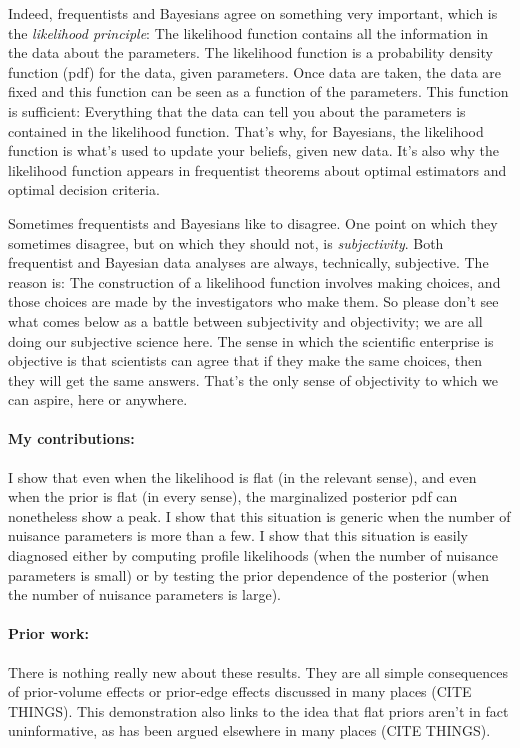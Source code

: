 \documentclass[10pt]{article}
\begin{document}
Indeed, frequentists and Bayesians agree on something very important,
which is the \emph{likelihood principle}:
The likelihood function contains all the information in the data about the parameters.
The likelihood function is a probability density function (pdf) for the data, given parameters.
Once data are taken, the data are fixed and this function can be seen as a function of the parameters.
This function is sufficient:
Everything that the data can tell you about the parameters is contained in the likelihood function.
That's why, for Bayesians, the likelihood function is what's used to update your beliefs, given new data.
It's also why the likelihood function appears in frequentist theorems about optimal estimators and optimal decision criteria.

Sometimes frequentists and Bayesians like to disagree.
One point on which they sometimes disagree, but on which they should not, is \emph{subjectivity}.
Both frequentist and Bayesian data analyses are always, technically, subjective.
The reason is: The construction of a likelihood function involves making choices, and those choices are made by the investigators who make them.
So please don't see what comes below as a battle between subjectivity and objectivity; we are all doing our subjective science here.
The sense in which the scientific enterprise is objective is that scientists can agree that if they make the same choices, then they will get the same answers.
That's the only sense of objectivity to which we can aspire, here or anywhere.

\paragraph{My contributions:}
I show that even when the likelihood is flat (in the relevant sense), and even when the prior is flat (in every sense), the marginalized posterior pdf can nonetheless show a peak.
I show that this situation is generic when the number of nuisance parameters is more than a few.
I show that this situation is easily diagnosed either by computing profile likelihoods (when the number of nuisance parameters is small) or by testing the prior dependence of the posterior (when the number of nuisance parameters is large).

\paragraph{Prior work:}
There is nothing really new about these results.
They are all simple consequences of prior-volume effects or prior-edge effects discussed in many places (CITE THINGS).
This demonstration also links to the idea that flat priors aren't in fact uninformative, as has been argued elsewhere in many places (CITE THINGS).
\end{document}
